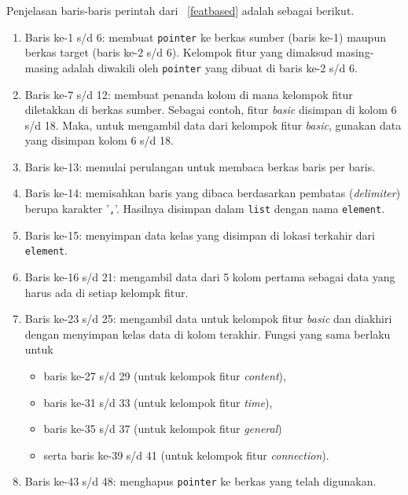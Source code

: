 Penjelasan baris-baris perintah dari \lstlistingname~\ref{featbased} adalah sebagai berikut.
\begin{enumerate}
  \item Baris ke-1 s/d 6: membuat \texttt{pointer} ke berkas sumber (baris ke-1) maupun berkas target (baris ke-2 s/d 6). Kelompok fitur yang dimaksud masing-masing adalah diwakili oleh \texttt{pointer} yang dibuat di baris ke-2 s/d 6.
  \item Baris ke-7 s/d 12: membuat penanda kolom di mana kelompok fitur diletakkan di berkas sumber. Sebagai contoh, fitur \textit{basic} disimpan di kolom 6 s/d 18. Maka, untuk mengambil data dari kelompok fitur \textit{basic}, gunakan data yang disimpan kolom 6 s/d 18.
  \item Baris ke-13: memulai perulangan untuk membaca berkas baris per baris.
  \item Baris ke-14: memisahkan baris yang dibaca berdasarkan pembatas (\textit{delimiter}) berupa karakter '\texttt{,}'. Hasilnya disimpan dalam \texttt{list} dengan nama \texttt{element}.
  \item Baris ke-15: menyimpan data kelas yang disimpan di lokasi terkahir dari \texttt{element}.
  \item Baris ke-16 s/d 21: mengambil data dari 5 kolom pertama sebagai data yang harus ada di setiap kelompk fitur.
  \item Baris ke-23 s/d 25: mengambil data untuk kelompok fitur \textit{basic} dan diakhiri dengan menyimpan kelas data di kolom terakhir. Fungsi yang sama berlaku untuk
  \begin{itemize}
     \item baris ke-27 s/d 29 (untuk kelompok fitur \textit{content}),
     \item baris ke-31 s/d 33 (untuk kelompok fitur \textit{time}),
     \item baris ke-35 s/d 37 (untuk kelompok fitur \textit{general})
     \item serta baris ke-39 s/d 41 (untuk kelompok fitur \textit{connection}).
   \end{itemize}
   \item Baris ke-43 s/d 48: menghapus \texttt{pointer} ke berkas yang telah digunakan.
\end{enumerate} 

